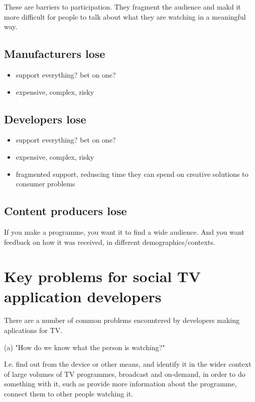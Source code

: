 \documentclass[]{article}%
\begin{document}
These are barriers to participation. They fragment the audience and makd it more difficult for people to talk about what they are watching in a meaningful way.

\subsection{Manufacturers lose}

\begin{itemize}
\item{support everything? bet on one?}
\item{expensive, complex, risky}
\end{itemize}

\subsection{Developers lose}

\begin{itemize}
\item{support everything? bet on one?}
\item{expensive, complex, risky}
\item{fragmented support, reduscing time they can spend on creative solutions to consumer problems}
\end{itemize}

\subsection{Content producers lose}

If you make a programme, you want it to find a wide audience. And you want feedback on how it was received, in different demographics/contexts.

\section{Key problems for social TV application developers}

There are a number of common problems encountered by developers making aplications for TV.

(a) "How do we know what the person is watching?" 

I.e. find out from the device or other means, and identify it in the wider context of large volumes of TV programmes, broadcast and on-demand, in order to do something with it, such as provide more information about the programme, connect them to other people watching it.
\end{document}

